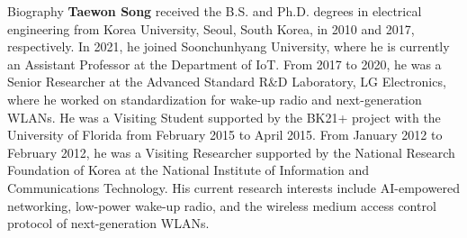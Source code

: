 \begin{rubric}{Biography}
\entry*[]%
\textbf{Taewon Song} received the B.S. and Ph.D. degrees in electrical engineering from Korea University, Seoul, South Korea, in 2010 and 2017, respectively. In 2021, he joined Soonchunhyang University, where he is currently an Assistant Professor at the Department of IoT. From 2017 to 2020, he was a Senior Researcher at the Advanced Standard R\&D Laboratory, LG Electronics, where he worked on standardization for wake-up radio and next-generation WLANs. He was a Visiting Student supported by the BK21+ project with the University of Florida from February 2015 to April 2015. From January 2012 to February 2012, he was a Visiting Researcher supported by the National Research Foundation of Korea at the National Institute of Information and Communications Technology. His current research interests include AI-empowered networking, low-power wake-up radio, and the wireless medium access control protocol of next-generation WLANs.
 
%
\end{rubric}